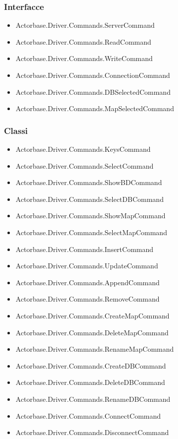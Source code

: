 \documentclass[a4paper]{article}
\begin{document}
		\subsubsection{Interfacce}
			\begin{itemize}
				\item Actorbase.Driver.Commands.ServerCommand
				\item Actorbase.Driver.Commands.ReadCommand
				\item Actorbase.Driver.Commands.WriteCommand
				\item Actorbase.Driver.Commands.ConnectionCommand
				\item Actorbase.Driver.Commands.DBSelectedCommand
				\item Actorbase.Driver.Commands.MapSelectedCommand
			\end{itemize}

		\subsubsection{Classi}
			\begin{itemize}
				\item Actorbase.Driver.Commands.KeysCommand
				\item Actorbase.Driver.Commands.SelectCommand
				\item Actorbase.Driver.Commands.ShowBDCommand
				\item Actorbase.Driver.Commands.SelectDBCommand
				\item Actorbase.Driver.Commands.ShowMapCommand
				\item Actorbase.Driver.Commands.SelectMapCommand
				\item Actorbase.Driver.Commands.InsertCommand
				\item Actorbase.Driver.Commands.UpdateCommand
				\item Actorbase.Driver.Commands.AppendCommand
				\item Actorbase.Driver.Commands.RemoveCommand
				\item Actorbase.Driver.Commands.CreateMapCommand
				\item Actorbase.Driver.Commands.DeleteMapCommand
				\item Actorbase.Driver.Commands.RenameMapCommand
				\item Actorbase.Driver.Commands.CreateDBCommand
				\item Actorbase.Driver.Commands.DeleteDBCommand
				\item Actorbase.Driver.Commands.RenameDBCommand
				\item Actorbase.Driver.Commands.ConnectCommand
				\item Actorbase.Driver.Commands.DisconnectCommand
			\end{itemize}
		
\end{document}

